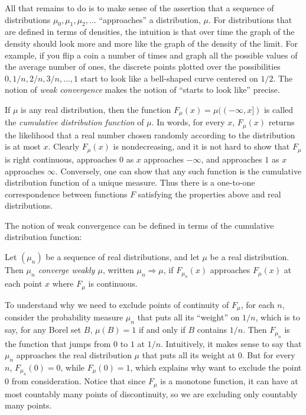 \documentclass{svjour3}
\begin{document}
All that remains to do is to make sense of the assertion that a sequence of distributions $\mu_0, \mu_1, \mu_2, \ldots$ ``approaches'' a distribution, $\mu$. For distributions that are defined in terms of densities, the intuition is that over time the graph of the density should look more and more like the graph of the density of the limit. For example, if you flip a coin a number of times and graph all the possible values of the average number of ones, the discrete points plotted over the possibilities $0, 1/n, 2/n, 3/n, \ldots, 1$ start to look like a bell-shaped curve centered on $1 / 2$. The notion of \emph{weak convergence} makes the notion of ``starts to look like'' precise.

If $\mu$ is any real distribution, then the function $F_\mu(x) = \mu((-\infty, x])$ is called the \emph{cumulative distribution function} of $\mu$. In words, for every $x$, $F_\mu(x)$ returns the likelihood that a real number chosen randomly according to the distribution is at most $x$. Clearly $F_\mu(x)$ is nondecreasing, and it is not hard to show that $F_\mu$ is right continuous, approaches $0$ as $x$ approaches $-\infty$, and approaches $1$ as $x$ approaches $\infty$. Conversely, one can show that any such function is the cumulative distribution function of a unique measure. Thus there is a one-to-one correspondence between functions $F$ satisfying the properties above and real distributions.

The notion of weak convergence can be defined in terms of the cumulative distribution function:
\begin{definition}
 Let $(\mu_n)$ be a sequence of real distributions, and let $\mu$ be a real distribution. Then \emph{$\mu_n$ converge weakly $\mu$}, written $\mu_n \Rightarrow \mu$, if $F_{\mu_n}(x)$ approaches $F_\mu(x)$ at each point $x$ where $F_\mu$ is continuous.
\end{definition}

To understand why we need to exclude points of continuity of $F_\mu$, for each $n$, consider the probability measure $\mu_n$ that puts all its ``weight'' on $1 / n$, which is to say, for any Borel set $B$, $\mu(B) = 1$ if and only if $B$ contains $1 / n$. Then $F_{\mu_n}$ is the function that jumps from $0$ to $1$ at $1 / n$. Intuitively, it makes sense to say that $\mu_n$ approaches the real distribution $\mu$ that puts all its weight at $0$. But for every $n$, $F_{\mu_n}(0) = 0$, while $F_\mu(0) = 1$, which explains why want to exclude the point $0$ from consideration. Notice that since $F_\mu$ is a monotone function, it can have at most countably many points of discontinuity, so we are excluding only countably many points.
\end{document}
